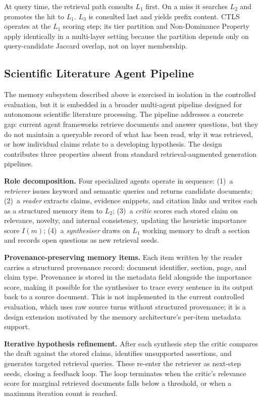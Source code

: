 At query time, the retrieval path consults $L_1$ first. On a miss it searches $L_2$ and promotes the hit to $L_1$. $L_3$ is consulted last and yields prefix content. CTLS operates at the $L_1$ scoring step; its tier partition and Non-Dominance Property apply identically in a multi-layer setting because the partition depends only on query-candidate Jaccard overlap, not on layer membership.

\subsection{Scientific Literature Agent Pipeline}
\label{sec:method_agent}

The memory subsystem described above is exercised in isolation in the controlled evaluation, but it is embedded in a broader multi-agent pipeline designed for autonomous scientific literature processing. The pipeline addresses a concrete gap: current agent frameworks retrieve documents and answer questions, but they do not maintain a queryable record of what has been read, why it was retrieved, or how individual claims relate to a developing hypothesis. The design contributes three properties absent from standard retrieval-augmented generation pipelines.

\textbf{Role decomposition.} Four specialized agents operate in sequence:
(1)~a \emph{retriever} issues keyword and semantic queries and returns candidate documents;
(2)~a \emph{reader} extracts claims, evidence snippets, and citation links and writes each as a structured memory item to $L_2$;
(3)~a \emph{critic} scores each stored claim on relevance, novelty, and internal consistency, updating the heuristic importance score $I(m)$;
(4)~a \emph{synthesiser} draws on $L_1$ working memory to draft a section and records open questions as new retrieval seeds.

\textbf{Provenance-preserving memory items.} Each item written by the reader carries a structured provenance record: document identifier, section, page, and claim type. Provenance is stored in the metadata field alongside the importance score, making it possible for the synthesiser to trace every sentence in its output back to a source document. This is not implemented in the current controlled evaluation, which uses raw source turns without structured provenance; it is a design extension motivated by the memory architecture's per-item metadata support.

\textbf{Iterative hypothesis refinement.} After each synthesis step the critic compares the draft against the stored claims, identifies unsupported assertions, and generates targeted retrieval queries. These re-enter the retriever as next-step seeds, closing a feedback loop. The loop terminates when the critic's relevance score for marginal retrieved documents falls below a threshold, or when a maximum iteration count is reached.

